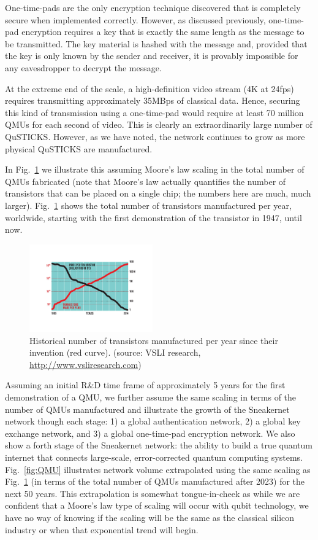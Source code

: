 \documentclass[twocolumn, aps, rmp, amsmath, amssymb, nofootinbib, superscriptaddress, longbibliography, floatfix, table-of-contents, eqsecnum]{revtex4-2}
\begin{document}
One-time-pads are the only encryption technique discovered that is completely secure when implemented correctly. However, as discussed previously, one-time-pad encryption requires a key that is exactly the same length as the message to be transmitted. The key material is hashed with the message and, provided that the key is only known by the sender and receiver, it is provably impossible for any eavesdropper to decrypt the message. 

At the extreme end of the scale, a high-definition video stream (4K at 24fps) requires transmitting approximately 35MBps of classical data. Hence, securing this kind of transmission using a one-time-pad would require at least 70 million QMUs for each second of video. This is clearly an extraordinarily large number of QuSTICKS. However, as we have noted, the network continues to grow as more physical QuSTICKS are manufactured. 

In Fig.~\ref{fig:transistor} we illustrate this assuming Moore's law scaling in the total number of QMUs fabricated (note that Moore's law actually quantifies the number of transistors that can be placed on a single chip; the numbers here are much, much larger). Fig.~\ref{fig:transistor} shows the total number of transistors manufactured per year, worldwide, starting with the first demonstration of the transistor in 1947, until now. 

\begin{figure}[htbp!]
	\includegraphics[clip=true, width=0.475\textwidth]{transistor}
	\caption{Historical number of transistors manufactured per year since their invention (red curve).  (source: VSLI research, \href{http://www.vsliresearch.com}{http://www.vsliresearch.com})} \label{fig:transistor}
\end{figure}

Assuming an initial R\&D time frame of approximately 5 years for the first demonstration of a QMU, we further assume the same scaling in terms of the number of QMUs manufactured and illustrate the growth of the Sneakernet network though each stage: 1) a global authentication network, 2) a global key exchange network, and 3) a global one-time-pad encryption network. We also show a forth stage of the Sneakernet network: the ability to build a true quantum internet that connects large-scale, error-corrected quantum computing systems. Fig.~\ref{fig:QMU} illustrates network volume extrapolated using the same scaling as Fig.~\ref{fig:transistor} (in terms of the total number of QMUs manufactured after 2023) for the next 50 years.  This extrapolation is somewhat tongue-in-cheek as while we are confident that a Moore's law type of scaling will occur with qubit technology, we have no way of knowing if the scaling will be the same as the classical silicon industry or when that exponential trend will begin. 
\end{document}
